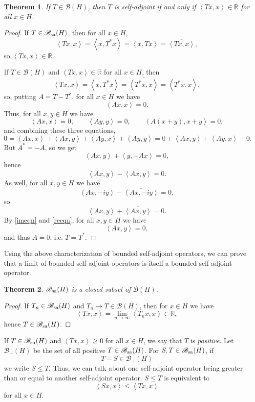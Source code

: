\documentclass{article}
\newcommand{\inner}[2]{\left\langle #1, #2 \right\rangle}
\newcommand{\SA}{\mathscr{B}_{\ensuremath\mathrm{sa}}(H)}
\newcommand{\positive}{\mathscr{B}_{\mathrm{+}}(H)}
\newtheorem{theorem}{Theorem}
\begin{document}
\begin{theorem}
If $T \in \mathscr{B}(H)$, then $T$ is self-adjoint if and only if $\inner{Tx}{x} \in \mathbb{R}$ for all $x \in H$.
\end{theorem}
\begin{proof}
If $T \in \SA$, then for all $x \in H$,
\[
\inner{Tx}{x} = \inner{x}{T^*x}=\inner{x}{Tx}=\overline{\inner{Tx}{x}},
\]
so $\inner{Tx}{x} \in \mathbb{R}$.

If $T \in \mathscr{B}(H)$ and $\inner{Tx}{x} \in \mathbb{R}$ for all $x \in H$, then 
\[
\inner{Tx}{x}=\inner{x}{T^*x}=\overline{\inner{T^*x}{x}}=\inner{T^*x}{x},
\]
so, putting $A=T-T^*$, for all $x \in H$ we have
\[
\inner{Ax}{x}=0.
\]
Thus, for all $x, y \in H$ we have
\[
\inner{Ax}{x}=0, \qquad \inner{Ay}{y}=0, \qquad \inner{A(x+y)}{x+y}=0,
\]
 and combining these three equations,
\[
0=\inner{Ax}{x}+\inner{Ax}{y}+\inner{Ay}{x}+\inner{Ay}{y}=0+\inner{Ax}{y}+\inner{Ay}{x}+0.
\]
But $A^*=-A$, so we get
\[
\inner{Ax}{y}+\inner{y}{-Ax}=0,
\]
hence
\begin{equation}
\inner{Ax}{y}-\overline{\inner{Ax}{y}}=0.
\label{imeqn}
\end{equation}
As well, for all $x,y \in H$ we have
\[
\inner{Ax}{-iy}-\overline{\inner{Ax}{-iy}}=0,
\]
so
\begin{equation}
\inner{Ax}{y}+\overline{\inner{Ax}{y}}=0.
\label{reeqn}
\end{equation}
By \eqref{imeqn} and \eqref{reeqn}, for all $x, y \in H$ we have
\[
\inner{Ax}{y}=0,
\]
and thus $A=0$, i.e. $T=T^*$.
\end{proof}

Using the above characterization of bounded self-adjoint operators, we can prove that a limit of bounded self-adjoint operators is itself a bounded self-adjoint operator.

\begin{theorem}
$\SA$ is a closed subset of $\mathscr{B}(H)$.
\end{theorem}
\begin{proof}
If $T_n \in \SA$ and $T_n \to T \in \mathscr{B}(H)$, then for $x \in H$ we have
\[
\inner{Tx}{x} = \lim_{n \to \infty} \inner{T_n x}{x} \in \mathbb{R},
\]
hence $T \in \SA$.
\end{proof} 

If $T \in \SA$ and $\inner{Tx}{x} \geq 0$ for all $x \in H$, we say that $T$ is {\em positive}. Let $\positive$ be the set of all
positive $T \in \SA$. For $S,T \in \SA$, if
\[
T-S \in \positive
\]
we write $S \leq T$. Thus, we can talk about one self-adjoint operator being greater than or equal to another self-adjoint operator.
$S \leq T$ is equivalent to
\[
\inner{Sx}{x} \leq \inner{Tx}{x}
\]
for all $x \in H$. 
\end{document}

